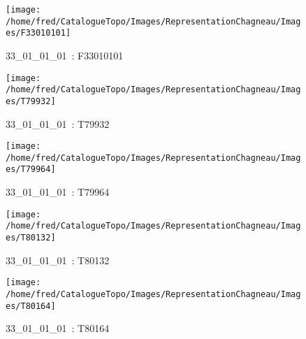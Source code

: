 \documentclass[12pt,titlepage,oneside]{book}
\begin{document}
\begin{figure}[h!]
  \hfill         %
  \begin{minipage}[t]{3cm}
    \begin{center}
      \texttt{[image: /home/fred/CatalogueTopo/Images/RepresentationChagneau/Images/F33010101]}
      \caption[~33\_01\_01\_01]{\small{33\_01\_01\_01~:} \tiny{F33010101}}\label{F33010101}
    \end{center}
  \end{minipage}
  \begin{minipage}[t]{3cm}
    \begin{center}
      \texttt{[image: /home/fred/CatalogueTopo/Images/RepresentationChagneau/Images/T79932]}
      \caption[~33\_01\_01\_01]{\small{33\_01\_01\_01~:} \tiny{T79932}}\label{T79932}
    \end{center}
  \end{minipage}
  \begin{minipage}[t]{3cm}
    \begin{center}
      \texttt{[image: /home/fred/CatalogueTopo/Images/RepresentationChagneau/Images/T79964]}
      \caption[~33\_01\_01\_01]{\small{33\_01\_01\_01~:} \tiny{T79964}}\label{T79964}
    \end{center}
  \end{minipage}
  \begin{minipage}[t]{3cm}
    \begin{center}
      \texttt{[image: /home/fred/CatalogueTopo/Images/RepresentationChagneau/Images/T80132]}
      \caption[~33\_01\_01\_01]{\small{33\_01\_01\_01~:} \tiny{T80132}}\label{T80132}
    \end{center}
  \end{minipage}
  \begin{minipage}[t]{3cm}
    \begin{center}
      \texttt{[image: /home/fred/CatalogueTopo/Images/RepresentationChagneau/Images/T80164]}
      \caption[~33\_01\_01\_01]{\small{33\_01\_01\_01~:} \tiny{T80164}}\label{T80164}
    \end{center}
  \end{minipage}
  \begin{minipage}[t]{3cm}
    \begin{center}

\end{center}
\end{minipage}
\end{figure}
\end{document}
